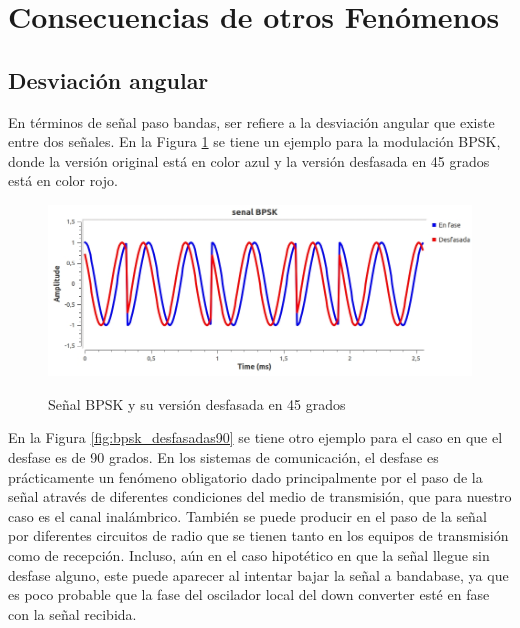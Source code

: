 \section{Consecuencias de otros Fenómenos}
\subsection{Desviación angular}
En términos de señal paso bandas, ser refiere a la desviación angular que existe entre dos señales. En la Figura \ref{fig:bpsk_desfasadas} se tiene un ejemplo para la modulación BPSK, donde la versión original está en color azul y la versión desfasada en 45 grados está en color rojo.\\

\begin{figure}[h!]
	\captionsetup{justification = raggedright, singlelinecheck = false}
	\caption{Señal BPSK y su versión desfasada en 45 grados} 
	\centering
	\includegraphics[scale=0.45]{Imagenes/bpsk_desfasadas.jpg}
	\label{fig:bpsk_desfasadas}
\end{figure}
En la Figura \ref{fig:bpsk_desfasadas90} se tiene otro ejemplo para el caso en que el desfase es de 90 grados. En los sistemas de comunicación, el desfase es prácticamente un fenómeno obligatorio dado principalmente por el paso de la señal através de diferentes condiciones del medio de transmisión, que para nuestro caso es el canal inalámbrico. También se puede producir en el paso de la señal por diferentes circuitos de radio que se tienen tanto en los equipos de transmisión como de recepción. Incluso, aún en el caso hipotético en que la señal llegue sin desfase alguno, este puede aparecer al intentar bajar la señal a bandabase, ya que es poco probable que la fase del oscilador local del down converter esté en fase con la señal recibida.  
